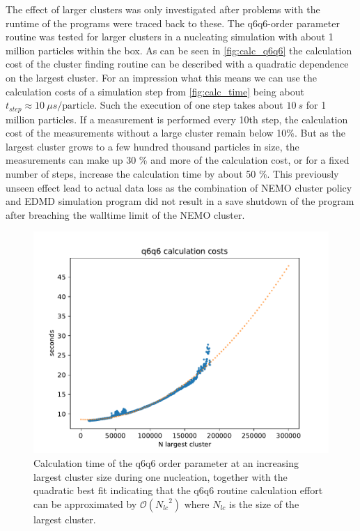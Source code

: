 The effect of larger clusters was only investigated after problems with the runtime of the programs were traced back to these. The q6q6-order parameter routine was tested for larger clusters in a nucleating simulation with about 1 million particles within the box. As can be seen in \autoref{fig:calc_q6q6} the calculation cost of the cluster finding routine can be described with a quadratic dependence on the largest cluster. For an impression what this means we can use the calculation costs of a simulation step from \autoref{fig:calc_time} being about $t_{step} \approx \SI{10}{\mu s \per \text{particle} }$. Such the execution of one step takes about $\SI{10}{s}$ for 1 million particles. If a measurement is performed every 10th step, the calculation cost of the measurements without a large cluster remain below 10\%. But as the largest cluster grows to a few hundred thousand particles in size, the measurements can make up 30 \% and more of the calculation cost, or for a fixed number of steps, increase the calculation time by about 50 \%. This previously unseen effect lead to actual data loss as the combination of NEMO cluster policy and EDMD simulation program did not result in a save shutdown of the program after breaching the walltime limit of the NEMO cluster.\\

\begin{figure}[h!]
\centering
\includegraphics[width=0.7 \linewidth]{../plots/q6q6_calculation_time.pdf}
\caption{Calculation time of the q6q6 order parameter at an increasing largest cluster size during one nucleation, together with the quadratic best fit indicating that the q6q6 routine calculation effort can be approximated by $\mathcal{O}({N_{lc}}^2)$ where $N_{lc}$ is the size of the largest cluster.}
\label{fig:calc_q6q6}
\end{figure}


